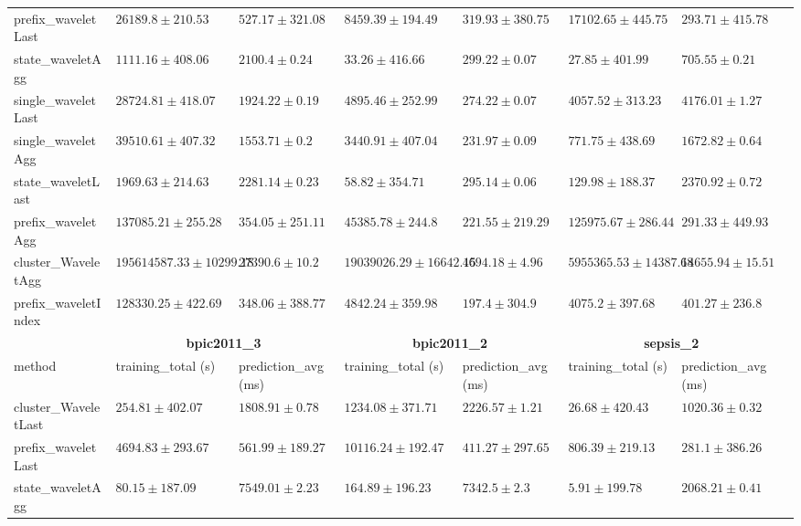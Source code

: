 \documentclass[twoside,11pt]{Latex/Classes/PhDthesisPSnPDF}
\begin{document}
\begin{table}[h]
{\begin{tabular}{llllllll}
		prefix\_waveletLast & $26189.8 \pm 210.53$ & $527.17 \pm 321.08$ & $8459.39 \pm 194.49$ & $319.93 \pm 380.75$ & $17102.65 \pm 445.75$ & $293.71 \pm 415.78$ \\ 
		state\_waveletAgg & $\mathbf{1111.16 \pm 408.06}$ & $2100.4 \pm 0.24$ & $\mathbf{33.26 \pm 416.66}$ & $299.22 \pm 0.07$ & $\mathbf{27.85 \pm 401.99}$ & $705.55 \pm 0.21$ \\ 
		single\_waveletLast & $28724.81 \pm 418.07$ & $1924.22 \pm 0.19$ & $4895.46 \pm 252.99$ & $274.22 \pm 0.07$ & $4057.52 \pm 313.23$ & $4176.01 \pm 1.27$ \\ 
		single\_waveletAgg & $39510.61 \pm 407.32$ & $1553.71 \pm 0.2$ & $3440.91 \pm 407.04$ & $231.97 \pm 0.09$ & $771.75 \pm 438.69$ & $1672.82 \pm 0.64$ \\ 
		state\_waveletLast & $1969.63 \pm 214.63$ & $2281.14 \pm 0.23$ & $58.82 \pm 354.71$ & $295.14 \pm 0.06$ & $129.98 \pm 188.37$ & $2370.92 \pm 0.72$ \\ 
		prefix\_waveletAgg & $137085.21 \pm 255.28$ & $354.05 \pm 251.11$ & $45385.78 \pm 244.8$ & $221.55 \pm 219.29$ & $125975.67 \pm 286.44$ & $\mathbf{291.33 \pm 449.93}$ \\ 
		cluster\_WaveletAgg & $195614587.33 \pm 10299.18$ & $27390.6 \pm 10.2$ & $19039026.29 \pm 16642.15$ & $4694.18 \pm 4.96$ & $5955365.53 \pm 14387.68$ & $14655.94 \pm 15.51$ \\ 
		prefix\_waveletIndex & $128330.25 \pm 422.69$ & $\mathbf{348.06 \pm 388.77}$ & $4842.24 \pm 359.98$ & $197.4 \pm 304.9$ & $4075.2 \pm 397.68$ & $401.27 \pm 236.8$ \\ 
		\bottomrule
		\toprule
		& \multicolumn{2}{c}{{\bfseries bpic2011\_3}} & \multicolumn{2}{c}{{\bfseries bpic2011\_2}} & \multicolumn{2}{c}{{\bfseries sepsis\_2}} \\ \cmidrule(lr){2-3} \cmidrule(lr){4-5} \cmidrule(lr){6-7}
		method  & training\_total (s) & prediction\_avg (ms) & training\_total (s) & prediction\_avg (ms) & training\_total (s) & prediction\_avg (ms) \\ \midrule
		cluster\_WaveletLast & $254.81 \pm 402.07$ & $1808.91 \pm 0.78$ & $1234.08 \pm 371.71$ & $2226.57 \pm 1.21$ & $26.68 \pm 420.43$ & $1020.36 \pm 0.32$ \\ 
		prefix\_waveletLast & $4694.83 \pm 293.67$ & $561.99 \pm 189.27$ & $10116.24 \pm 192.47$ & $411.27 \pm 297.65$ & $806.39 \pm 219.13$ & $\mathbf{281.1 \pm 386.26}$ \\ 
		state\_waveletAgg & $80.15 \pm 187.09$ & $7549.01 \pm 2.23$ & $164.89 \pm 196.23$ & $7342.5 \pm 2.3$ & $\mathbf{5.91 \pm 199.78}$ & $2068.21 \pm 0.41$ \\ 

\end{tabular}}
\end{table}
\end{document}

